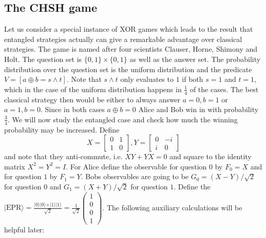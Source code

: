 \subsection{The CHSH game}
Let us consider a special instance of XOR games which leads to the result that entangled strategies actually can give a remarkable advantage over classical strategies. The game is named after four scientists Clauser, Horne, Shimony and Holt. The question set is $\{0,1\} \times \{0,1\}$ as well as the answer set. The probability distribution over the question set is the uniform distribution and the predicate $V = \left[ a \oplus b = s \land t\right] $. Note that $s \land t$ only evaluates to $1$ if both $s=1$ and $t=1$, which in the case of the uniform distribution happens in $\frac{1}{4}$ of the cases. The best classical strategy then would be either to always answer $a=0, b=1$ or $a=1, b=0$. Since in both cases $a \oplus b = 0$ Alice and Bob win in with probability $\frac{3}{4}$. We will now study the entangled case and check how much the winning probability may be increased. 
Define 
\begin{equation}
X = \begin{bmatrix}
0 & 1 \\
1 & 0
\end{bmatrix} , Y = \begin{bmatrix}
0 & -i \\ 
i & 0 
\end{bmatrix}
\end{equation}
and note that they anti-commute, i.e. $XY + YX = 0$ and square to the identity matrix $X^2 = Y^2 = I$. For Alice define the observable for question $0$ by $F_0 = X$ and for question $1$ by $F_1 = Y$. Bobs observables are going to be $G_0 = (X-Y)/ \sqrt{2}$ for question $0$ and $G_1 = (X+Y)/\sqrt{2}$ for question $1$.  Define the $\vert \text{EPR} \rangle = \frac{\vert 0 \rangle \vert 0 \rangle + \vert 1 \rangle \vert 1 \rangle}{\sqrt{2}} = \frac{1}{\sqrt{2}} \begin{pmatrix} 1 \\ 0 \\ 0 \\ 1 \end{pmatrix}$.
The following auxiliary calculations will be helpful later: 
